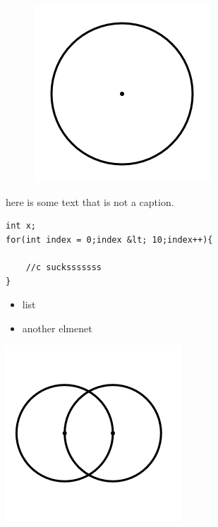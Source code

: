 \documentclass[11pt]{article}
\begin{document}
\begin{figure}[h]
\includegraphics{image1.png}

\caption{}
\end{figure}





here is some text that is not a caption.


\begin{lstlisting}
int x;
for(int index = 0;index &lt; 10;index++){

    //c sucksssssss
}
\end{lstlisting}
\begin{itemize}

\item
list 
\item
another elmenet 
\end{itemize}











































\includegraphics{image3.png}
\end{document}
